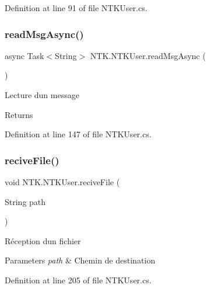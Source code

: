 Definition at line 91 of file N\+T\+K\+User.\+cs.

\mbox{\label{class_n_t_k_1_1_n_t_k_user_a049d42e91b000aefa6179750546e0a52}} 
\subsubsection{\texorpdfstring{readMsgAsync()}{readMsgAsync()}}
{\footnotesize\ttfamily async Task$<$String$>$ N\+T\+K.\+N\+T\+K\+User.\+read\+Msg\+Async (\begin{DoxyParamCaption}{ }\end{DoxyParamCaption})}



Lecture d\textquotesingle{}un message 

\begin{DoxyReturn}{Returns}

\end{DoxyReturn}


Definition at line 147 of file N\+T\+K\+User.\+cs.

\mbox{\label{class_n_t_k_1_1_n_t_k_user_ae141a3d5ed333fa9fb5b2fbf3136f81f}} 
\subsubsection{\texorpdfstring{reciveFile()}{reciveFile()}}
{\footnotesize\ttfamily void N\+T\+K.\+N\+T\+K\+User.\+recive\+File (\begin{DoxyParamCaption}\item[{String}]{path }\end{DoxyParamCaption})}



Réception d\textquotesingle{}un fichier 


\begin{DoxyParams}{Parameters}
{\em path} & Chemin de destination\\
\hline
\end{DoxyParams}


Definition at line 205 of file N\+T\+K\+User.\+cs.

\mbox{\label{class_n_t_k_1_1_n_t_k_user_a5e5f555882081eafcab8c919169cd5fe}} 
